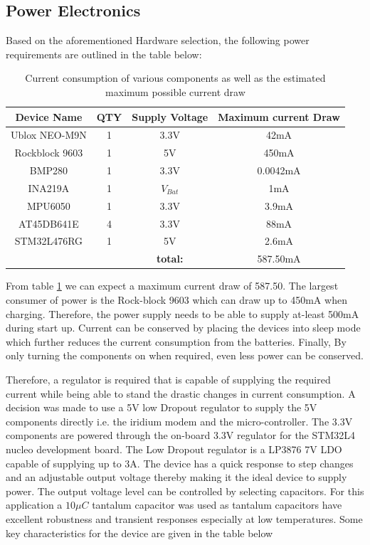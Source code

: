\subsection{Power Electronics}

Based on the aforementioned Hardware selection, the following power requirements are outlined in the table below:

\begin{table}[H]
	\centering
	\caption{Current consumption of various components as well as the estimated maximum possible current draw}
	\begin{tabular}{|c|c |c|c|}
		\hline
		Device Name & QTY &  Supply Voltage & Maximum current Draw\\
		\hline
		Ublox NEO-M9N & 1 & 3.3V & 42mA \\
		\hline
		Rockblock 9603 & 1 & 5V &  450mA\\
		\hline
		BMP280 & 1 & 3.3V & 0.0042mA\\
		\hline
		INA219A & 1 & $V_{Bat}$ & 1mA\\
		MPU6050 & 1 & 3.3V & 3.9mA\\
		\hline 
		AT45DB641E & 4 & 3.3V & 88mA\\
		\hline
		STM32L476RG & 1 & 5V & 2.6mA\\
		\hline
		\cline{4-4}
		\multicolumn{2}{c}{} &\multicolumn{1}{c}{\textbf{total:}} & \multicolumn{1}{c}{587.50mA} \\
		\cline{4-4}
		\cline{4-4}
	\end{tabular}
	
	\label{tab:pow_budget}
\end{table}

From table \ref{tab:pow_budget} we can expect a maximum current draw of 587.50. The largest consumer of power is the Rock-block 9603 which can draw up to 450mA when charging. Therefore, the power supply needs to be able to supply at-least 500mA during start up. Current can be conserved by placing the devices into sleep mode which further reduces the current consumption from the batteries. Finally, By only turning the components on when required, even less power can be conserved. \par 

Therefore, a regulator is required that is capable of supplying the required current  while being able to stand the drastic changes in current consumption. A decision was made to use a 5V low Dropout regulator to supply the 5V components directly i.e. the iridium modem and the micro-controller. The 3.3V components are powered through the on-board 3.3V regulator for the STM32L4 nucleo development board. The Low Dropout regulator is a LP3876 7V LDO capable of supplying up to 3A. The device has a quick response to step changes and an adjustable output voltage thereby making it the ideal device to supply power. The output voltage level can be controlled by selecting capacitors. For this application a $10 \mu C$ tantalum capacitor was used as tantalum capacitors have  excellent robustness and transient responses especially at low temperatures.  Some key characteristics for the device are given in the table below

